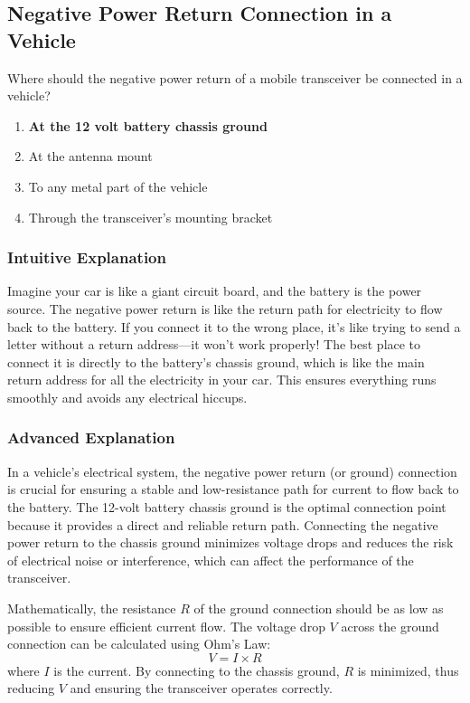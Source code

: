 \subsection{Negative Power Return Connection in a Vehicle}
\label{T4A11}

\begin{tcolorbox}[colback=gray!10!white,colframe=black!75!black,title=T4A11]
Where should the negative power return of a mobile transceiver be connected in a vehicle?
\begin{enumerate}[label=\Alph*)]
    \item \textbf{At the 12 volt battery chassis ground}
    \item At the antenna mount
    \item To any metal part of the vehicle
    \item Through the transceiver’s mounting bracket
\end{enumerate}
\end{tcolorbox}

\subsubsection*{Intuitive Explanation}
Imagine your car is like a giant circuit board, and the battery is the power source. The negative power return is like the return path for electricity to flow back to the battery. If you connect it to the wrong place, it’s like trying to send a letter without a return address—it won’t work properly! The best place to connect it is directly to the battery’s chassis ground, which is like the main return address for all the electricity in your car. This ensures everything runs smoothly and avoids any electrical hiccups.

\subsubsection*{Advanced Explanation}
In a vehicle’s electrical system, the negative power return (or ground) connection is crucial for ensuring a stable and low-resistance path for current to flow back to the battery. The 12-volt battery chassis ground is the optimal connection point because it provides a direct and reliable return path. Connecting the negative power return to the chassis ground minimizes voltage drops and reduces the risk of electrical noise or interference, which can affect the performance of the transceiver.

Mathematically, the resistance \( R \) of the ground connection should be as low as possible to ensure efficient current flow. The voltage drop \( V \) across the ground connection can be calculated using Ohm’s Law:
\[
V = I \times R
\]
where \( I \) is the current. By connecting to the chassis ground, \( R \) is minimized, thus reducing \( V \) and ensuring the transceiver operates correctly.

